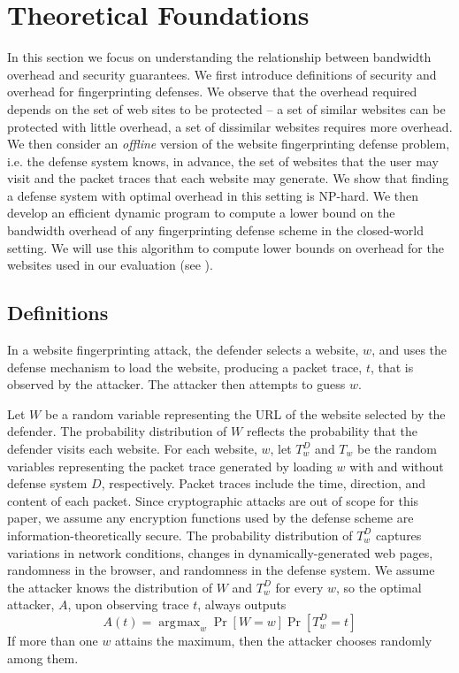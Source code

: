 \documentclass[10pt,journal]{IEEEtran}
\DeclareMathOperator*{\argmax}{\arg\!\max}
\begin{document}
\section{Theoretical Foundations}
\label{sec:theory}

In this section we focus on understanding the relationship between
bandwidth overhead and security guarantees. We first introduce
definitions of security and overhead for fingerprinting defenses.  We
observe that the overhead required depends on the set of web sites to
be protected -- a set of similar websites can be protected with little
overhead, a set of dissimilar websites requires more overhead.  We
then consider an \emph{offline} version of the website fingerprinting
defense problem, i.e. the defense system knows, in advance, the set of
websites that the user may visit and the packet traces that each
website may generate.  We show that finding a defense system with
optimal overhead in this setting is NP-hard.  We then develop an
efficient dynamic program to compute a lower bound on the bandwidth
overhead of any fingerprinting defense scheme in the closed-world
setting. We will use this algorithm to compute lower bounds on
overhead for the websites used in our evaluation (see
).


\subsection{Definitions}
\label{subsec:security_def}

In a website fingerprinting attack, the defender selects a website,
$w$, and uses the defense mechanism to load the website, producing a
packet trace, $t$, that is observed by the attacker.  The attacker
then attempts to guess $w$.

Let $W$ be a random variable representing the URL of the website
selected by the defender.  The probability distribution of $W$
reflects the probability that the defender visits each website.  For
each website, $w$, let $T^D_w$ and $T_w$ be the random variables representing the
packet trace generated by loading $w$ with and without defense system $D$, respectively.
Packet traces include the time, direction, and content of each packet.
Since cryptographic attacks are out of scope for this paper, we assume
any encryption functions used by the defense scheme are
information-theoretically secure.  The probability distribution of
$T^D_w$ captures variations in network conditions, changes in
dynamically-generated web pages, randomness in the browser, and
randomness in the defense system.  We assume the attacker knows the
distribution of $W$ and $T^D_w$ for every $w$, so the optimal
attacker, $A$, upon observing trace $t$, always outputs
\[
A(t) = \argmax_w\Pr[W=w]\Pr\left[T^D_w=t\right]
\]
If more than one $w$ attains the maximum, then the attacker chooses
randomly among them.
\end{document}
